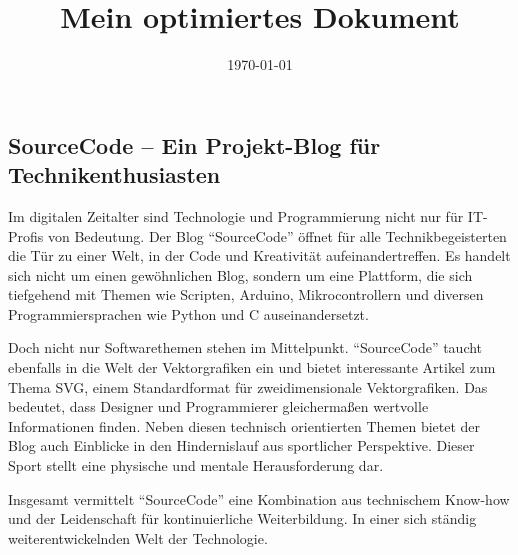 \documentclass[12pt,a4paper]{scrartcl}
\title{Mein optimiertes Dokument}
\date{\today}
\begin{document}
\maketitle

\hypertarget{sourcecode-ein-projekt-blog-fuxfcr-technikenthusiasten}{%
\subsection{SourceCode -- Ein Projekt-Blog für
Technikenthusiasten}\label{sourcecode-ein-projekt-blog-fuxfcr-technikenthusiasten}}

Im digitalen Zeitalter sind Technologie und Programmierung nicht nur für
IT-Profis von Bedeutung. Der Blog ``SourceCode'' öffnet für alle
Technikbegeisterten die Tür zu einer Welt, in der Code und Kreativität
aufeinandertreffen. Es handelt sich nicht um einen gewöhnlichen Blog,
sondern um eine Plattform, die sich tiefgehend mit Themen wie Scripten,
Arduino, Mikrocontrollern und diversen Programmiersprachen wie Python
und C auseinandersetzt.

Doch nicht nur Softwarethemen stehen im Mittelpunkt. ``SourceCode''
taucht ebenfalls in die Welt der Vektorgrafiken ein und bietet
interessante Artikel zum Thema SVG, einem Standardformat für
zweidimensionale Vektorgrafiken. Das bedeutet, dass Designer und
Programmierer gleichermaßen wertvolle Informationen finden. Neben diesen
technisch orientierten Themen bietet der Blog auch Einblicke in den
Hindernislauf aus sportlicher Perspektive. Dieser Sport stellt eine
physische und mentale Herausforderung dar.

Insgesamt vermittelt ``SourceCode'' eine Kombination aus technischem
Know-how und der Leidenschaft für kontinuierliche Weiterbildung. In
einer sich ständig weiterentwickelnden Welt der
Technologie. %
\end{document}
